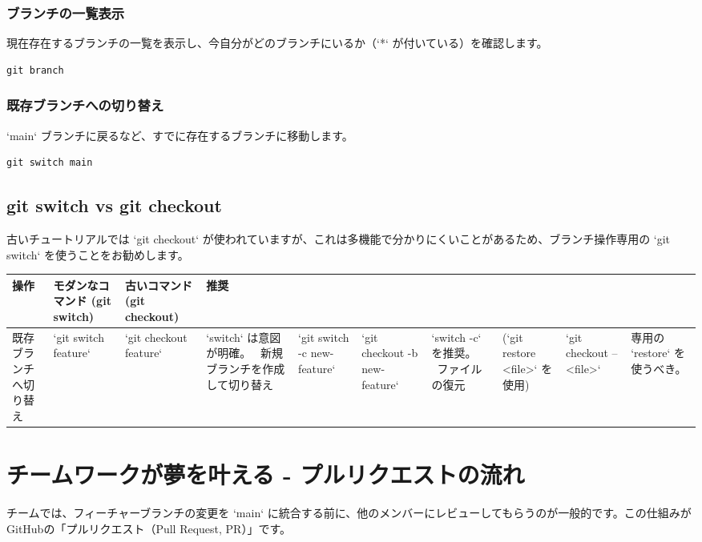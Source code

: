 \documentclass{ltjsarticle}
\begin{document}
\subsubsection{ブランチの一覧表示}
現在存在するブランチの一覧を表示し、今自分がどのブランチにいるか（`*` が付いている）を確認します。
\begin{verbatim}
git branch
\end{verbatim}

\subsubsection{既存ブランチへの切り替え}
`main` ブランチに戻るなど、すでに存在するブランチに移動します。
\begin{verbatim}
git switch main
\end{verbatim}

\subsection{git switch vs git checkout}
古いチュートリアルでは `git checkout` が使われていますが、これは多機能で分かりにくいことがあるため、ブランチ操作専用の `git switch` を使うことをお勧めします。
\begin{tabularx}{\textwidth}{|l|l|l|X|}
\hline
\textbf{操作} & \textbf{モダンなコマンド (git switch)} & \textbf{古いコマンド (git checkout)} & \textbf{推奨} \\ 
\hline
既存ブランチへ切り替え & `git switch feature` & `git checkout feature` & `switch` は意図が明確。 \ 
新規ブランチを作成して切り替え & `git switch -c new-feature` & `git checkout -b new-feature` & `switch -c` を推奨。 \ 
ファイルの復元 & (`git restore <file>` を使用) & `git checkout -- <file>` & 専用の `restore` を使うべき。 \ 
\hline
\end{tabularx}

\section{チームワークが夢を叶える - プルリクエストの流れ}
チームでは、フィーチャーブランチの変更を `main` に統合する前に、他のメンバーにレビューしてもらうのが一般的です。この仕組みがGitHubの「プルリクエスト（Pull Request, PR）」です。
\end{document}
